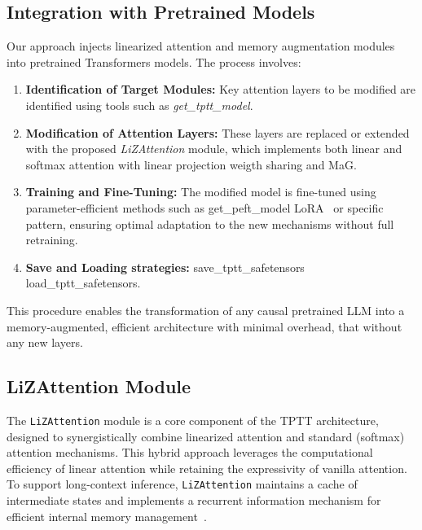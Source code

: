 \documentclass[10pt,a4paper]{article}
\begin{document}


\subsection{Integration with Pretrained Models}

Our approach injects linearized attention and memory augmentation modules into pretrained Transformers models. The process involves:
\begin{enumerate}
    \item \textbf{Identification of Target Modules:} Key attention layers to be modified are identified using tools such as \textit{get\_tptt\_model}.
    \item \textbf{Modification of Attention Layers:} These layers are replaced or extended with the proposed \textit{LiZAttention} module, which implements both linear and softmax attention with linear projection weigth sharing and MaG.
    \item \textbf{Training and Fine-Tuning:} The modified model is fine-tuned using parameter-efficient methods such as {get\_peft\_model} LoRA~\cite{hu2022lora} or specific pattern, ensuring optimal adaptation to the new mechanisms without full retraining.
    \item \textbf{Save and Loading strategies:} {save\_tptt\_safetensors} {load\_tptt\_safetensors}.
\end{enumerate}
This procedure enables the transformation of any causal pretrained LLM into a memory-augmented, efficient architecture with minimal overhead, that without any new layers.


\subsection{LiZAttention Module}

The \texttt{LiZAttention} module is a core component of the TPTT architecture, designed to synergistically combine linearized attention and standard (softmax) attention mechanisms. This hybrid approach leverages the computational efficiency of linear attention while retaining the expressivity of vanilla attention. To support long-context inference, \texttt{LiZAttention} maintains a cache of intermediate states and implements a recurrent information mechanism for efficient internal memory management~\cite{katharopoulos2020transformers}.
\end{document}
